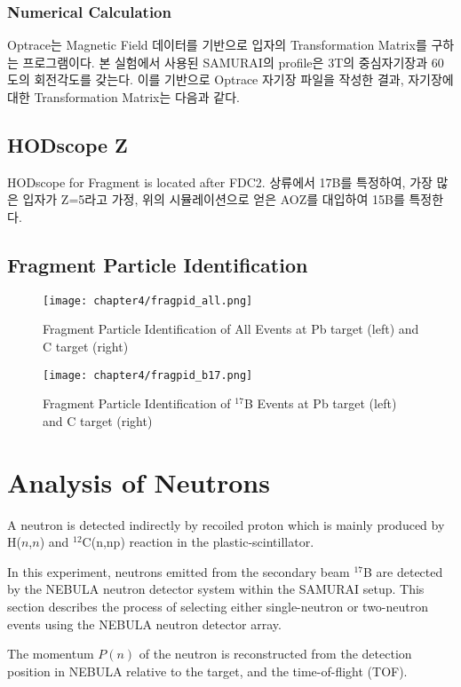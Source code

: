 \subsubsection{Numerical Calculation}
Optrace는 Magnetic Field 데이터를 기반으로 입자의 Transformation Matrix를 구하는 프로그램이다. 본 실험에서 사용된 SAMURAI의 profile은 3T의 중심자기장과 60도의 회전각도를 갖는다. 이를 기반으로 Optrace 자기장 파일을 작성한 결과, 자기장에 대한 Transformation Matrix는 다음과 같다.

\subsection{HODscope Z}
HODscope for Fragment is located after FDC2. 
상류에서 17B를 특정하여, 가장 많은 입자가 Z=5라고 가정, 위의 시뮬레이션으로 얻은 AOZ를 대입하여 15B를 특정한다.
\subsection{Fragment Particle Identification}
\begin{figure}
    \centering
    \texttt{[image: chapter4/fragpid\_all.png]}
    \caption[Fragment Particle Identification from All Secondary Beam]{Fragment Particle Identification of All Events at Pb target (left) and C target (right)}
\end{figure}

\begin{figure}
    \centering
    \texttt{[image: chapter4/fragpid\_b17.png]}
    \caption[Fragment Particle Identification from ${}^{17}$B Beam]{Fragment Particle Identification of ${}^{17}$B Events at Pb target (left) and C target (right)}
\end{figure}

\clearpage

\section{Analysis of Neutrons}
A neutron is detected indirectly by recoiled proton which is mainly produced by H($n$,$n$) and ${}^{12}$C(n,np) reaction in the plastic-scintillator. 

In this experiment, neutrons emitted from the secondary beam ${}^{17}$B are detected by the NEBULA neutron detector system within the SAMURAI setup. This section describes the process of selecting either single-neutron or two-neutron events using the NEBULA neutron detector array. 

The momentum $P(n)$ of the neutron is reconstructed from the detection position in NEBULA relative to the target, and the time-of-flight (TOF). 

